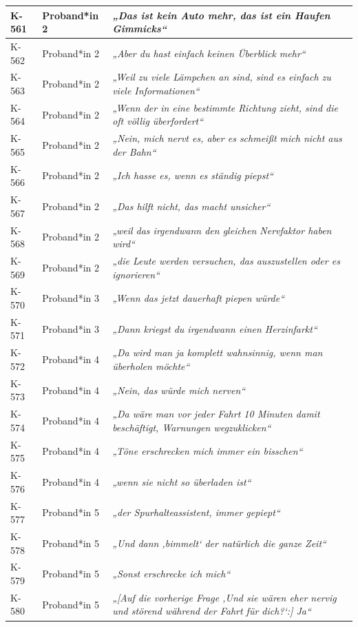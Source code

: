 {\begin{xltabular}{\textwidth}{
    |P{0.10\textwidth}
    |P{0.17\textwidth}
    |Y|
}
K-561 & Proband*in 2 & \textit{„Das ist kein Auto mehr, das ist ein Haufen Gimmicks“} \\
\hline
K-562 & Proband*in 2 & \textit{„Aber du hast einfach keinen Überblick mehr“} \\
\hline
K-563 & Proband*in 2 & \textit{„Weil zu viele Lämpchen an sind, sind es einfach zu viele Informationen“} \\
\hline
K-564 & Proband*in 2 & \textit{„Wenn der in eine bestimmte Richtung zieht, sind die oft völlig überfordert“} \\
\hline
K-565 & Proband*in 2 & \textit{„Nein, mich nervt es, aber es schmeißt mich nicht aus der Bahn“} \\
\hline
K-566 & Proband*in 2 & \textit{„Ich hasse es, wenn es ständig piepst“} \\
\hline
K-567 & Proband*in 2 & \textit{„Das hilft nicht, das macht unsicher“} \\
\hline
K-568 & Proband*in 2 & \textit{„weil das irgendwann den gleichen Nervfaktor haben wird“} \\
\hline
K-569 & Proband*in 2 & \textit{„die Leute werden versuchen, das auszustellen oder es ignorieren“} \\
\hline
K-570 & Proband*in 3 & \textit{„Wenn das jetzt dauerhaft piepen würde“} \\
\hline
K-571 & Proband*in 3 & \textit{„Dann kriegst du irgendwann einen Herzinfarkt“} \\
\hline
K-572 & Proband*in 4 & \textit{„Da wird man ja komplett wahnsinnig, wenn man überholen möchte“} \\
\hline
K-573 & Proband*in 4 & \textit{„Nein, das würde mich nerven“} \\
\hline
K-574 & Proband*in 4 & \textit{„Da wäre man vor jeder Fahrt 10 Minuten damit beschäftigt, Warnungen wegzuklicken“} \\
\hline
K-575 & Proband*in 4 & \textit{„Töne erschrecken mich immer ein bisschen“} \\
\hline
K-576 & Proband*in 4 & \textit{„wenn sie nicht so überladen ist“} \\
\hline
K-577 & Proband*in 5 & \textit{„der Spurhalteassistent, immer gepiept“} \\
\hline
K-578 & Proband*in 5 & \textit{„Und dann ‚bimmelt‘ der natürlich die ganze Zeit“} \\
\hline
K-579 & Proband*in 5 & \textit{„Sonst erschrecke ich mich“} \\
\hline
K-580 & Proband*in 5 & \textit{„[Auf die vorherige Frage ‚Und sie wären eher nervig und störend während der Fahrt für dich?‘:] Ja“} \\

\end{xltabular}}
